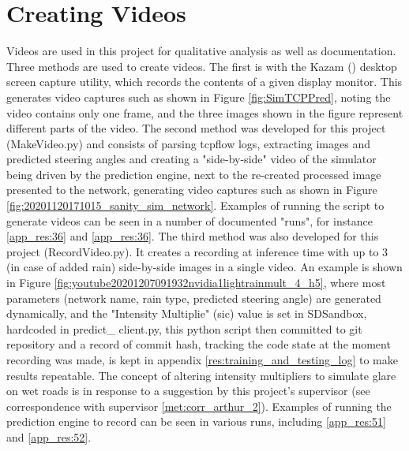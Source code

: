 \section{Creating Videos}
Videos are used in this project for qualitative analysis as well as documentation. Three methods are used to create videos. The first is with the Kazam (\cite{Kazam2020}) desktop screen capture utility, which records the contents of a given display monitor. This generates video captures such as shown in Figure \ref{fig:SimTCPPred}, noting the video contains only one frame, and the three images shown in the figure represent different parts of the video. The second method was developed for this project (MakeVideo.py) and consists of parsing tcpflow logs, extracting images and predicted steering angles and creating a "side-by-side" video of the simulator being driven by the prediction engine, next to the re-created processed image presented to the network, generating video captures such as shown in Figure  \ref{fig:20201120171015_sanity_sim_network}. Examples of running the script to generate videos can be seen in a number of documented "runs", for instance \ref{app_res:36} and \ref{app_res:36}. The third method was also developed for this project (RecordVideo.py). It creates a recording at inference time with up to 3 (in case of added rain) side-by-side images in a single video. An example is shown in Figure \ref{fig:youtube20201207091932nvidia1lightrainmult_4_h5}, where most parameters (network name, rain type, predicted steering angle) are generated dynamically, and the "Intensity Multiplie" (sic) value is set in SDSandbox, hardcoded in predict\_ client.py, this python script then committed to git repository and a record of commit hash, tracking the code state at the moment recording was made, is kept in appendix \ref{res:training_and_testing_log} to make results repeatable. The concept of altering intensity multipliers to simulate glare on wet roads is in response to a suggestion by this project's supervisor (see correspondence with supervisor \ref{met:corr_arthur_2}). Examples of running the prediction engine to record can be seen in various runs, including \ref{app_res:51} and \ref{app_res:52}.

